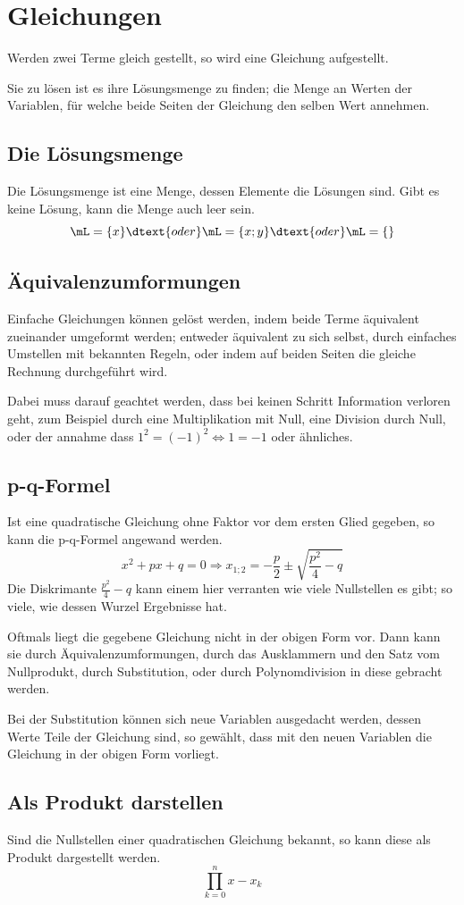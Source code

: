 \documentclass{article}
\begin{document}
\section{Gleichungen}
Werden zwei Terme gleich gestellt, so wird eine Gleichung aufgestellt.

Sie zu lösen ist es ihre Lösungsmenge zu finden; die Menge an Werten der Variablen, für welche beide Seiten der Gleichung den selben Wert annehmen.

\subsection{Die Lösungsmenge}
Die Lösungsmenge \tL ist eine Menge, dessen Elemente die Lösungen sind. Gibt es keine Lösung, kann die Menge auch leer sein.
\[
 \mL = \{x\} \dtext{oder}
 \mL = \{x;y\} \dtext{oder}
 \mL = \{\}
\]

\subsection{Äquivalenzumformungen}
Einfache Gleichungen können gelöst werden, indem beide Terme äquivalent zueinander umgeformt werden; entweder äquivalent zu sich selbst, durch einfaches Umstellen mit bekannten Regeln, oder indem auf beiden Seiten die gleiche Rechnung durchgeführt wird.

Dabei muss darauf geachtet werden, dass bei keinen Schritt Information verloren geht, zum Beispiel durch eine Multiplikation mit Null, eine Division durch Null, oder der annahme dass ${1^2 = (-1)^2 \Leftrightarrow 1 = -1}$ oder ähnliches.

\subsection{p-q-Formel}
Ist eine quadratische Gleichung ohne Faktor vor dem ersten Glied gegeben, so kann die p-q-Formel angewand werden.
\[
 x^2 + px + q = 0
 \Rightarrow
 x_{1;2} = -\frac{p}{2} \pm \sqrt{\frac{p^2}{4}-q}
\]
Die Diskrimante $\frac{p^2}{4}-q$ kann einem hier verranten wie viele Nullstellen es gibt; so viele, wie dessen Wurzel Ergebnisse hat.

Oftmals liegt die gegebene Gleichung nicht in der obigen Form vor. Dann kann sie durch Äquivalenzumformungen, durch das Ausklammern und den Satz vom Nullprodukt, durch Substitution, oder durch Polynomdivision in diese gebracht werden.

Bei der Substitution können sich neue Variablen ausgedacht werden, dessen Werte Teile der Gleichung sind, so gewählt, dass mit den neuen Variablen die Gleichung in der obigen Form vorliegt.

\subsection{Als Produkt darstellen}
Sind die Nullstellen einer quadratischen Gleichung bekannt, so kann diese als Produkt dargestellt werden.
\[
 \prod_{k=0}^n x-x_k
\]
\end{document}
